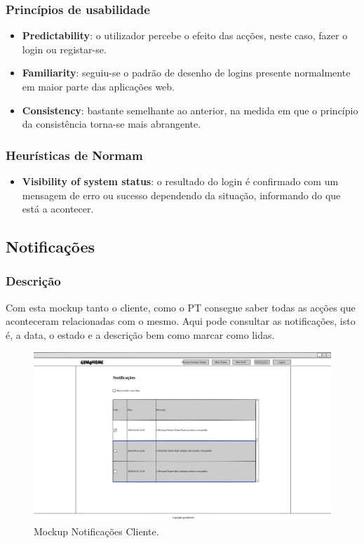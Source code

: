 \subsubsection{Princípios de usabilidade}
\begin{itemize}
    \item \textbf{Predictability}: o utilizador percebe o efeito das acções, neste caso, fazer o login ou registar-se.
    \item \textbf{Familiarity}: seguiu-se o padrão de desenho de logins presente normalmente em maior parte das aplicações web.
    \item \textbf{Consistency}: bastante semelhante ao anterior, na medida em que o princípio da consistência torna-se mais abrangente.
\end{itemize}

\subsubsection{Heurísticas de Normam}
\begin{itemize}
    \item \textbf{Visibility of system status}: o resultado do login é confirmado com um mensagem de erro ou sucesso dependendo da situação, informando do que está a acontecer.
\end{itemize}

\subsection{Notificações}
\label{subsec:notificacoescliente}

\subsubsection{Descrição}
\hspace{5mm} Com esta mockup tanto o cliente, como o PT consegue saber todas as acções que aconteceram relacionadas com o mesmo. Aqui pode consultar as notificações, isto é, a data, o estado e a descrição bem como marcar como lidas.

\begin{figure}[H]
    \centering
    \includegraphics[scale=0.25]{images/mockups/cliente_notificaes.png}
    \caption{Mockup Notificações Cliente.}
    \label{fig:mockupnotificacoescliente}
\end{figure}

